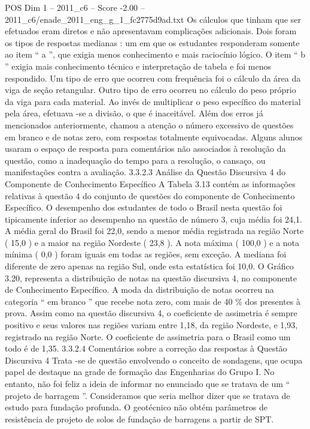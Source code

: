 \begin{textsample}{POS Dim 1 – 2011\_c6 – Score -2.00 – 2011\_c6/enade\_2011\_eng\_g\_1\_fc2775d9ad.txt}
Os cálculos que tinham que ser efetuados eram diretos e não apresentavam complicações adicionais.
Dois foram os tipos de respostas medianas : um em que os estudantes responderam somente ao item “ a ”, que exigia menos conhecimento e mais raciocínio lógico.
O item “ b ” exigia mais conhecimento técnico e interpretação de tabela e foi menos respondido.
Um tipo de erro que ocorreu com frequência foi o cálculo da área da viga de seção retangular.
Outro tipo de erro ocorreu no cálculo do peso próprio da viga para cada material.
Ao invés de multiplicar o peso específico do material pela área, efetuava -se a divisão, o que é inaceitável.
Além dos erros já mencionados anteriormente, chamou a atenção o número excessivo de questões em branco e de notas zero, com respostas totalmente equivocadas.
Alguns alunos usaram o espaço de resposta para comentários não associados à resolução da questão, como a inadequação do tempo para a resolução, o cansaço, ou manifestações contra a avaliação. 3.3.2.3 Análise da Questão Discursiva 4 do Componente de Conhecimento Específico A Tabela 3.13 contém as informações relativas à questão 4 do conjunto de questões do componente de Conhecimento Específico.
O desempenho dos estudantes de todo o Brasil nesta questão foi tipicamente inferior ao desempenho na questão de número 3, cuja média foi 24,1.
A média geral do Brasil foi 22,0, sendo a menor média registrada na região Norte ( 15,0 ) e a maior na região Nordeste ( 23,8 ).
A nota máxima ( 100,0 ) e a nota mínima ( 0,0 ) foram iguais em todas as regiões, sem exceção.
A mediana foi diferente de zero apenas na região Sul, onde esta estatística foi 10,0.
O Gráfico 3.20, representa a distribuição de notas na questão discursiva 4, no componente de Conhecimento Específico.
A moda da distribuição de notas ocorreu na categoria “ em branco ” que recebe nota zero, com mais de 40 \% dos presentes à prova.
Assim como na questão discursiva 4, o coeficiente de assimetria é sempre positivo e seus valores nas regiões variam entre 1,18, da região Nordeste, e 1,93, registrado na região Norte.
O coeficiente de assimetria para o Brasil como um todo é de 1,35. 3.3.2.4 Comentários sobre a correção das respostas à Questão Discursiva 4 Trata -se de questão envolvendo o conceito de sondagens, que ocupa papel de destaque na grade de formação das Engenharias do Grupo I.
No entanto, não foi feliz a ideia de informar no enunciado que se tratava de um “ projeto de barragem ”.
Consideramos que seria melhor dizer que se tratava de estudo para fundação profunda.
O geotécnico não obtém parâmetros de resistência de projeto de solos de fundação de barragens a partir de SPT.

\end{textsample}
